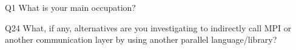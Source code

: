 \begin{description}%
\item{Q1} What is your main occupation?%
\item{Q24} What, if any, alternatives are you investigating to indirectly call MPI or another communication layer by using another parallel language/library?%
\end{description}%
